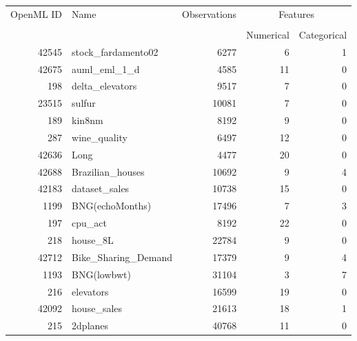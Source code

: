 \begin{table}[h!]
\centering
\begin{tabular}{rlrrr}
\toprule
\multirow{2}{*}{OpenML ID} & \multirow{2}{*}{Name} & \multirow{2}{*}{Observations} & \multicolumn{2}{c}{Features} \\ \cline{4-5}
\\[-0.75em]
&                       &                            & Numerical    & Categorical   \\
\midrule
     42545 &  stock\_fardamento02 &         6277 &                6 &                1 \\
     42675 &        auml\_eml\_1\_d &         4585 &               11 &                0 \\
       198 &     delta\_elevators &         9517 &                7 &                0 \\
     23515 &              sulfur &        10081 &                7 &                0 \\
       189 &              kin8nm &         8192 &                9 &                0 \\
       287 &        wine\_quality &         6497 &               12 &                0 \\
     42636 &                Long &         4477 &               20 &                0 \\
     42688 &    Brazilian\_houses &        10692 &                9 &                4 \\
     42183 &       dataset\_sales &        10738 &               15 &                0 \\
      1199 &     BNG(echoMonths) &        17496 &                7 &                3 \\
       197 &             cpu\_act &         8192 &               22 &                0 \\
       218 &            house\_8L &        22784 &                9 &                0 \\
     42712 & Bike\_Sharing\_Demand &        17379 &                9 &                4 \\
      1193 &         BNG(lowbwt) &        31104 &                3 &                7 \\
       216 &           elevators &        16599 &               19 &                0 \\
     42092 &         house\_sales &        21613 &               18 &                1 \\
       215 &            2dplanes &        40768 &               11 &                0 \\

\end{tabular}
\end{table}
